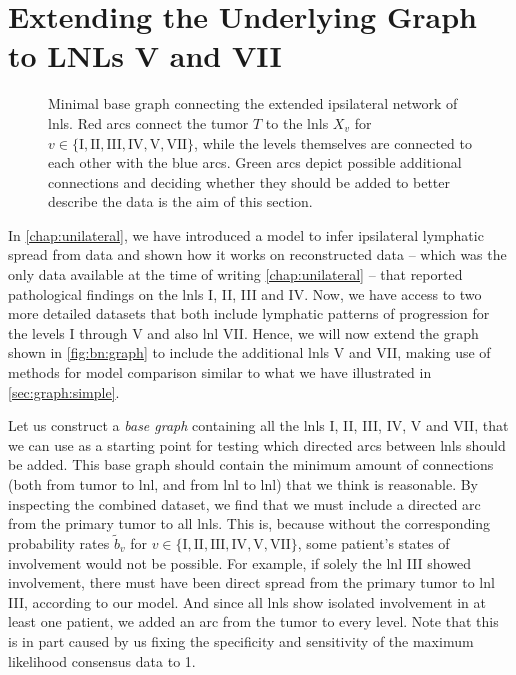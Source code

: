 \documentclass[\relativeRoot/main.tex]{subfiles}
\begin{document}
\section[Extending the Underlying Graph to LNLs V and VII]{Extending the Underlying Graph\\to LNLs V and VII}
\label{sec:graph:extended}

\begin{figure}
    \centering
    \def\svgwidth{0.4\textwidth}
    
    \caption[
        Base graph of the extended ipsilateral model
    ]{
        Minimal base graph connecting the extended ipsilateral network of \glspl{lnl}. Red arcs connect the tumor $T$ to the \glspl{lnl} $X_v$ for $v \in \{ \text{I}, \text{II}, \text{III}, \text{IV}, \text{V}, \text{VII} \}$, while the levels themselves are connected to each other with the blue arcs. Green arcs depict possible additional connections and deciding whether they should be added to better describe the data is the aim of this section.
    }
    \label{fig:graph:extended_graph}
\end{figure}

In \cref{chap:unilateral}, we have introduced a model to infer ipsilateral lymphatic spread from data and shown how it works on reconstructed data -- which was the only data available at the time of writing \cref{chap:unilateral} -- that reported pathological findings on the \glspl{lnl} I, II, III and IV. Now, we have access to two more detailed datasets that both include lymphatic patterns of progression for the levels I through V and also \gls{lnl} VII. Hence, we will now extend the graph shown in \cref{fig:bn:graph} to include the additional \glspl{lnl} V and VII, making use of methods for model comparison similar to what we have illustrated in \cref{sec:graph:simple}.

Let us construct a \emph{base graph} containing all the \glspl{lnl} I, II, III, IV, V and VII, that we can use as a starting point for testing which directed arcs between \glspl{lnl} should be added. This base graph should contain the minimum amount of connections (both from tumor to \gls{lnl}, and from \gls{lnl} to \gls{lnl}) that we think is reasonable. By inspecting the combined dataset, we find that we must include a directed arc from the primary tumor to all \glspl{lnl}. This is, because without the corresponding probability rates $\tilde{b}_v$ for $v \in \{ \text{I}, \text{II}, \text{III}, \text{IV}, \text{V}, \text{VII} \}$, some patient's states of involvement would not be possible. For example, if solely the \gls{lnl} III showed involvement, there must have been direct spread from the primary tumor to \gls{lnl} III, according to our model. And since all \glspl{lnl} show isolated involvement in at least one patient, we added an arc from the tumor to every level. Note that this is in part caused by us fixing the specificity and sensitivity of the maximum likelihood consensus data to 1.
\end{document}
